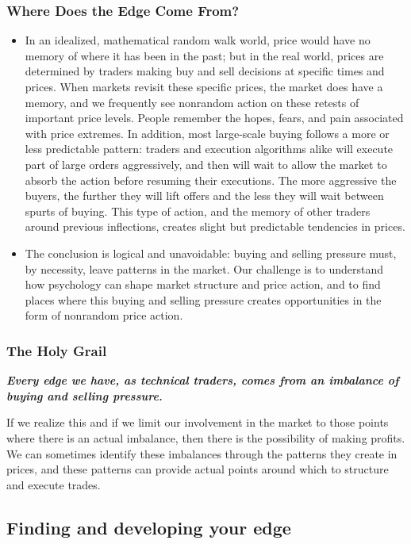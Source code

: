 \documentclass[10pt,twocolumn]{article}
\begin{document}
\subsubsection{Where Does the Edge Come From?}
\begin{itemize}
  \item In an idealized, mathematical random walk world, price would have no memory of where it has been in the past; but in the real world, prices are determined by traders making buy and sell decisions at specific times and prices. When markets revisit these specific prices, the market does have a memory, and we frequently see nonrandom action on these retests of important price levels. People remember the hopes, fears, and pain associated with price extremes. In addition, most large-scale buying follows a more or less predictable pattern: traders and execution algorithms alike will execute part of large orders aggressively, and then will wait to allow the market to absorb the action before resuming their executions. The more aggressive the buyers, the further they will lift offers and the less they will wait between spurts of buying. This type of action, and the memory of other traders around previous inflections, creates slight but predictable tendencies in prices.
  \item The conclusion is logical and unavoidable: buying and selling pressure must, by necessity, leave patterns in the market. Our challenge is to understand how psychology can shape market structure and price action, and to find places where this buying and selling pressure creates opportunities in the form of nonrandom price action.
\end{itemize}

\subsubsection{The Holy Grail}
\textbf{\textit{Every edge we have, as technical traders, comes from an imbalance of buying and selling pressure.}}

If we realize this and if we limit our involvement in the market to those points where there is an actual imbalance, then there is the possibility of making profits. We can sometimes identify these imbalances through the patterns they create in prices, and these patterns can provide actual points around which to structure and execute trades.


\subsection{Finding and developing your edge}
\end{document}
